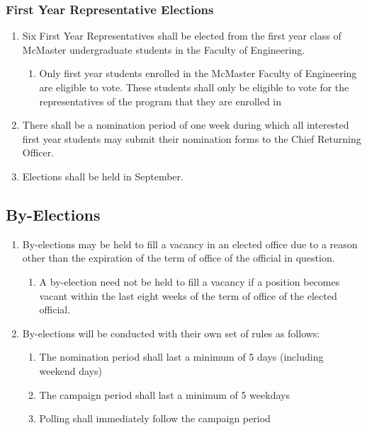 \subsubsection{First Year Representative Elections}
\label{first-year-representative-elections}
\begin{enumerate}
 \item
  Six First Year Representatives shall be elected from the first year class of McMaster undergraduate students in the Faculty of Engineering.

  \begin{enumerate}
   \item
    Only first year students enrolled in the McMaster Faculty of Engineering are eligible to vote. These students shall only be eligible to vote for the representatives of the program that they are enrolled in
  \end{enumerate}
 \item
  There shall be a nomination period of one week during which all interested first year students may submit their nomination forms to the Chief Returning Officer.
 \item
  Elections shall be held in September.
\end{enumerate}
\subsection{By-Elections}
\label{by-elections}

\begin{enumerate}
 \item
  By-elections may be held to fill a vacancy in an elected office due to a reason other than the expiration of the term of office of the official in question.

  \begin{enumerate}
   \item
    A by-election need not be held to fill a vacancy if a position becomes vacant within the last eight weeks of the term of office of the elected official.
  \end{enumerate}
 \item
  By-elections will be conducted with their own set of rules as follows:

  \begin{enumerate}
   \item
    The nomination period shall last a minimum of 5 days (including weekend days)
   \item
    The campaign period shall last a minimum of 5 weekdays
   \item
    Polling shall immediately follow the campaign period
  \end{enumerate}
\end{enumerate}

